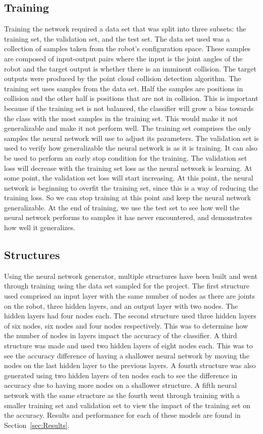 \documentclass[conference]{IEEEtran}
\begin{document}
\subsection{Training}
Training the network required a data set that was split into three subsets: the training set, the validation set, and the test set. The data set used was a collection of samples taken from the robot's configuration space. These samples are composed of input-output pairs where the input is the joint angles of the robot and the target output is whether there is an imminent collision. The target outputs were produced by the point cloud collision detection algorithm. The training set uses samples from the data set. Half the samples are positions in collision and the other half is positions that are not in collision. This is important because if the training set is not balanced, the classifier will grow a bias towards the class with the most samples in the training set. This would make it not generalizable and make it not perform well. The training set comprises the only samples the neural network will use to adjust its parameters. The validation set is used to verify how generalizable the neural network is as it is training. It can also be used to perform an early stop condition for the training. The validation set loss will decrease with the training set loss as the neural network is learning. At some point, the validation set loss will start increasing. At this point, the neural network is beginning to overfit the training set, since this is a way of reducing the training loss. So we can stop training at this point and keep the neural network generalizable. At the end of training, we use the test set to see how well the neural network performs to samples it has never encountered, and demonstrates how well it generalizes. 

\subsection{Structures}
Using the neural network generator, multiple structures have been built and went through training using the data set sampled for the project. The first structure used comprised an input layer with the same number of nodes as there are joints on the robot, three hidden layers, and an output layer with two nodes. The hidden layers had four nodes each. The second structure used three hidden layers of six nodes, six nodes and four nodes respectively. This was to determine how the number of nodes in layers impact the accuracy of the classifier. A third structure was made and used two hidden layers of eight nodes each. This was to see the accuracy difference of having a shallower neural network by moving the nodes on the last hidden layer to the previous layers. A fourth structure was also generated using two hidden layers of ten nodes each to see the difference in accuracy due to having more nodes on a shallower structure. A fifth neural network with the same structure as the fourth went through training with a smaller training set and validation set to view the impact of the training set on the accuracy. Results and performance for each of these models are found in Section~\ref{sec:Results}.
\end{document}
